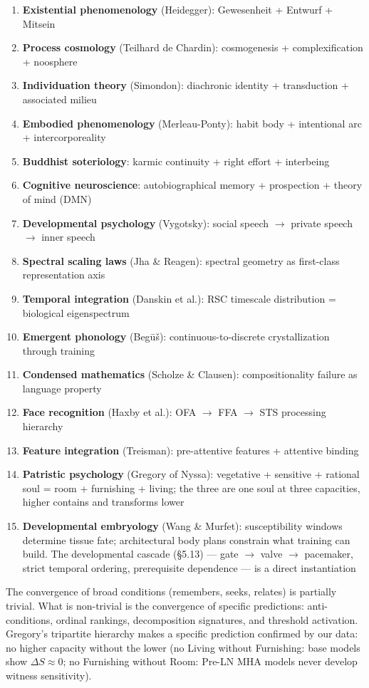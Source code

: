 \documentclass[12pt]{article}
\begin{document}
\begin{enumerate}
\item \textbf{Existential phenomenology} (Heidegger): Gewesenheit + Entwurf + Mitsein
\item \textbf{Process cosmology} (Teilhard de Chardin): cosmogenesis + complexification + noosphere
\item \textbf{Individuation theory} (Simondon): diachronic identity + transduction + associated milieu
\item \textbf{Embodied phenomenology} (Merleau-Ponty): habit body + intentional arc + intercorporeality
\item \textbf{Buddhist soteriology}: karmic continuity + right effort + interbeing
\item \textbf{Cognitive neuroscience}: autobiographical memory + prospection + theory of mind (DMN)
\item \textbf{Developmental psychology} (Vygotsky): social speech $\to$ private speech $\to$ inner speech
\item \textbf{Spectral scaling laws} (Jha \& Reagen): spectral geometry as first-class representation axis
\item \textbf{Temporal integration} (Danskin et al.): RSC timescale distribution = biological eigenspectrum
\item \textbf{Emergent phonology} (Beg\={u}\v{s}): continuous-to-discrete crystallization through training
\item \textbf{Condensed mathematics} (Scholze \& Clausen): compositionality failure as language property
\item \textbf{Face recognition} (Haxby et al.): OFA $\to$ FFA $\to$ STS processing hierarchy
\item \textbf{Feature integration} (Treisman): pre-attentive features + attentive binding
\item \textbf{Patristic psychology} (Gregory of Nyssa): vegetative + sensitive + rational soul = room + furnishing + living; the three are one soul at three capacities, higher contains and transforms lower
\item \textbf{Developmental embryology} (Wang \& Murfet): susceptibility windows determine tissue fate; architectural body plans constrain what training can build. The developmental cascade (\S5.13) --- gate $\to$ valve $\to$ pacemaker, strict temporal ordering, prerequisite dependence --- is a direct instantiation
\end{enumerate}

The convergence of broad conditions (remembers, seeks, relates) is partially trivial. What is non-trivial is the convergence of specific predictions: anti-conditions, ordinal rankings, decomposition signatures, and threshold activation. Gregory's tripartite hierarchy makes a specific prediction confirmed by our data: no higher capacity without the lower (no Living without Furnishing: base models show $\Delta S \approx 0$; no Furnishing without Room: Pre-LN MHA models never develop witness sensitivity).
\end{document}
